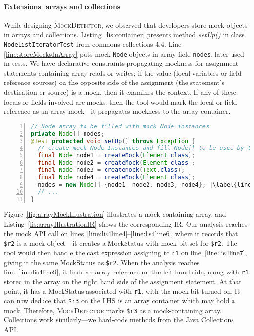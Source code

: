 \paragraph{Extensions: arrays and collections} While designing \textsc{MockDetector}, we observed that developers store mock objects in arrays and collections. Listing~\ref{lis:container} presents method \textit{setUp()} in class \texttt{NodeListIteratorTest} from commons-collections-4.4. Line \ref{line:storeMocksInArray} puts mock \texttt{Node} objects in array field \texttt{nodes}, later used in tests. We have declarative constraints propagating mockness for assignment statements containing array reads or writes; if the value (local variables or field reference sources) on the opposite side of the assignment (the statement's destination or source) is a mock, then it examines the context. If any of these locals or fields involved are mocks, then the tool would mark the local or field reference as an array mock---it propagates mockness to the array container.

\begin{lstlisting}[basicstyle=\ttfamily, caption={This example illustrates a field array container holding mock objects from \textit{setUp()} in \texttt{NodeListIteratorTest}.},
numbers=left,numbersep=2pt,basicstyle=\scriptsize\ttfamily,language = Java, framesep=4.5mm, framexleftmargin=1.0mm, captionpos=b, label=lis:container, escapechar=|, morekeywords={@Test}]
// Node array to be filled with mock Node instances
private Node[] nodes;
@Test protected void setUp() throws Exception {
  // create mock Node Instances and fill Node[] to be used by tests
  final Node node1 = createMock(Element.class);
  final Node node2 = createMock(Element.class);
  final Node node3 = createMock(Text.class);
  final Node node4 = createMock(Element.class);
  nodes = new Node[] {node1, node2, node3, node4}; |\label{line:storeMocksInArray}|
  // ...
}
\end{lstlisting}

Figure~\ref{fig:arrayMockIllustration} illustrates a mock-containing array, and Listing~\ref{lis:arrayIllustrationIR} shows the corresponding IR. Our analysis reaches the mock API call on lines~\ref{line:lis4line4}--\ref{line:lis4line6}, where it records that \texttt{\$r2} is a mock object---it creates a MockStatus with mock bit set for \texttt{\$r2}. The tool would then handle the cast expression assigning to \texttt{r1} on line~\ref{line:lis4line7}, giving it the same MockStatus as \texttt{\$r2}. When the analysis reaches line~\ref{line:lis4line9}, it finds an array reference on the left hand side, along with \texttt{r1} stored in the array on the right hand side of the assignment statement. At that point, it has a MockStatus associated with \texttt{r1}, with the mock bit turned on. It can now deduce that \texttt{\$r3} on the LHS is an array container which may hold a mock. Therefore, \textsc{MockDetector} marks \texttt{\$r3} as a mock-containing array. Collections work similarly---we hard-code methods from the Java Collections API.

